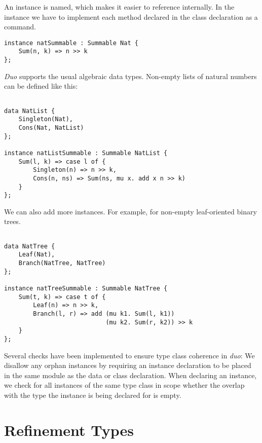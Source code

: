 An instance is named, which makes it easier to reference internally.
In the instance we have to implement each method declared in the class declaration as a command.

\begin{lstlisting}[style=duostyle, label=code:duo-nat-list, captionpos=b, caption={Instance declaration for natural numbers in \emph{duo}}]
instance natSummable : Summable Nat {
    Sum(n, k) => n >> k
};
\end{lstlisting}

\emph{Duo} supports the usual algebraic data types. Non-empty lists of natural numbers can be defined like this:

\begin{lstlisting}[style=duostyle, label=code:duo-nat-list-two, captionpos=b, caption={Data and instance declaration for non-empty lists of in \emph{duo}}]

data NatList {
    Singleton(Nat),
    Cons(Nat, NatList)
};

instance natListSummable : Summable NatList {
    Sum(l, k) => case l of {
        Singleton(n) => n >> k,
        Cons(n, ns) => Sum(ns, mu x. add x n >> k)
    }
};

\end{lstlisting}

We can also add more instances. For example, for non-empty leaf-oriented binary trees.

\begin{lstlisting}[style=duostyle, label=code:duo-tree-instance, captionpos=b, caption={Type class example  in \emph{duo}}]

data NatTree {
    Leaf(Nat),
    Branch(NatTree, NatTree)
};

instance natTreeSummable : Summable NatTree {
    Sum(t, k) => case t of {
        Leaf(n) => n >> k,
        Branch(l, r) => add (mu k1. Sum(l, k1))
                            (mu k2. Sum(r, k2)) >> k
    }
};

\end{lstlisting}

Several checks have been implemented to ensure type class coherence in \emph{duo}:
We disallow any orphan instances by requiring an instance declaration to be placed in the same module as the data or class declaration.
When declaring an instance, we check for all instances of the same type class in scope whether the overlap with the type the instance is being declared for is empty.


\section{Refinement Types}
\label{sec:refinement-types}

